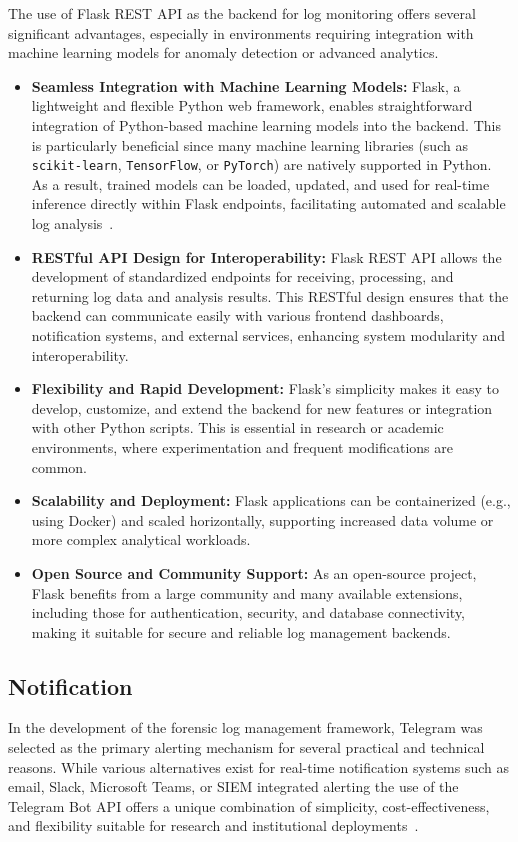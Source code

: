The use of Flask REST API as the backend for log monitoring offers several significant advantages, especially in environments requiring integration with machine learning models for anomaly detection or advanced analytics.

\begin{itemize}
	\item \textbf{Seamless Integration with Machine Learning Models:} Flask, a lightweight and flexible Python web framework, enables straightforward integration of Python-based machine learning models into the backend. This is particularly beneficial since many machine learning libraries (such as \texttt{scikit-learn}, \texttt{TensorFlow}, or \texttt{PyTorch}) are natively supported in Python. As a result, trained models can be loaded, updated, and used for real-time inference directly within Flask endpoints, facilitating automated and scalable log analysis~\cite{garg2023preserving}.
	
	\item \textbf{RESTful API Design for Interoperability:} Flask REST API allows the development of standardized endpoints for receiving, processing, and returning log data and analysis results. This RESTful design ensures that the backend can communicate easily with various frontend dashboards, notification systems, and external services, enhancing system modularity and interoperability.
	
	\item \textbf{Flexibility and Rapid Development:} Flask’s simplicity makes it easy to develop, customize, and extend the backend for new features or integration with other Python scripts. This is essential in research or academic environments, where experimentation and frequent modifications are common.
	
	\item \textbf{Scalability and Deployment:} Flask applications can be containerized (e.g., using Docker) and scaled horizontally, supporting increased data volume or more complex analytical workloads.
	
	\item \textbf{Open Source and Community Support:} As an open-source project, Flask benefits from a large community and many available extensions, including those for authentication, security, and database connectivity, making it suitable for secure and reliable log management backends.
\end{itemize}


\subsection{Notification}
In the development of the forensic log management framework, Telegram was selected as the primary alerting mechanism for several practical and technical reasons. While various alternatives exist for real-time notification systems such as email, Slack, Microsoft Teams, or SIEM integrated alerting the use of the Telegram Bot API offers a unique combination of simplicity, cost-effectiveness, and flexibility suitable for research and institutional deployments~\cite{wang2023telegramalert}.


